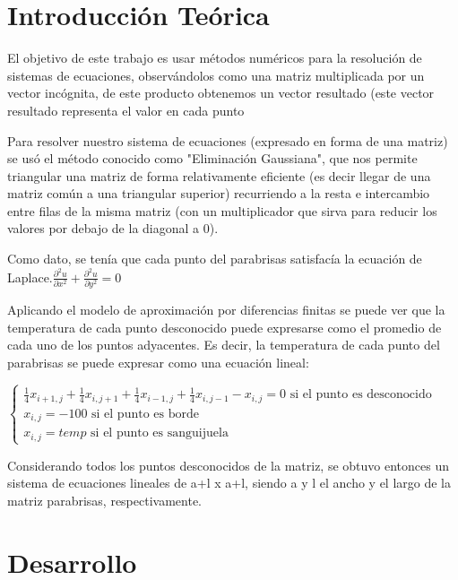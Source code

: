 \documentclass[spanish,a4paper]{article}
\begin{document}
\newpage

\section{Introducci\'{o}n Te\'{o}rica}
\label{sec:intro}

El objetivo de este trabajo es usar métodos numéricos para la resolución de sistemas de ecuaciones, observándolos como una matriz multiplicada por un vector incógnita, de este producto obtenemos un vector resultado (este vector resultado representa el valor en cada punto

Para resolver nuestro sistema de ecuaciones (expresado en forma de una matriz) se usó el método conocido como "Eliminación Gaussiana", que nos permite triangular una matriz de forma relativamente eficiente (es decir llegar de una matriz común a una triangular superior) recurriendo a la resta e intercambio entre filas de la misma matriz (con un multiplicador que sirva para reducir los valores por debajo de la diagonal a 0). 

Como dato, se tenía que cada punto del parabrisas satisfacía la ecuación de Laplace.\newline $\frac{\partial ^2u}{\partial x^2}+\frac{\partial ^2u}{\partial y^2}=0$

Aplicando el modelo de aproximación por diferencias finitas se puede ver que la temperatura de cada punto desconocido puede expresarse como el promedio de cada uno de los puntos adyacentes. Es decir, la temperatura de cada punto del parabrisas se puede expresar como una ecuación lineal:  \newline 

$\left \{\begin{matrix}
\frac{1}{4}x_{i+1,j}+\frac{1}{4}x_{i,j+1}+\frac{1}{4}x_{i-1,j}+\frac{1}{4}x_{i,j-1}-x_{i,j}=0 \text{ si el punto es desconocido} \\  x_{i,j}=-100 \text{ si el punto es borde} \\ x_{i,j}=temp \text{ si el punto es sanguijuela} \end{matrix}$

Considerando todos los puntos desconocidos de la matriz, se obtuvo entonces un sistema de ecuaciones lineales de a+l x a+l, siendo a y l el ancho y el largo de la matriz parabrisas, respectivamente.

\newpage

\section{Desarrollo}
\label{sec:desarrollo}
\end{document}
